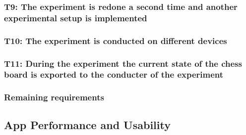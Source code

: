 \subsubsection*{T9: The experiment is redone a second time and another experimental setup is implemented}

\subsubsection*{T10: The experiment is conducted on different devices}

\subsubsection*{T11: During the experiment the current state of the chess board is exported to the conducter of the experiment}

\subsubsection*{Remaining requirements}






\subsection{App Performance and Usability}
